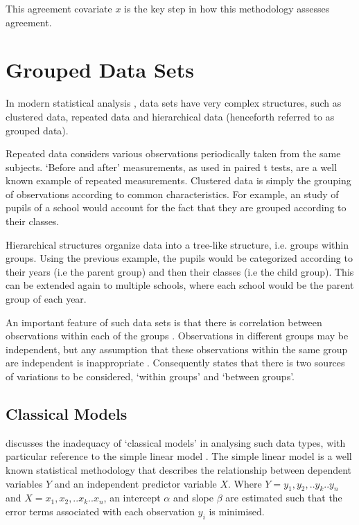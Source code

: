 \documentclass[12pt, a4paper]{report}
\theoremstyle{plain}
\theoremstyle{definition}
\theoremstyle{remark}
\begin{document}
This agreement covariate $x$ is the key step in how this
methodology assesses agreement.

\section{Grouped Data Sets}
In modern statistical analysis , data sets have very complex
structures, such as  clustered data, repeated data and
hierarchical data (henceforth referred to as grouped data).

Repeated data considers various observations periodically taken
from the same subjects. `Before and after' measurements, as used
in paired t tests, are a well known example of repeated
measurements. Clustered data is simply the grouping of
observations according to common characteristics. For example, an
study of pupils of a school would account for the fact that they
are grouped according to their classes.

Hierarchical structures organize data into a tree-like structure,
i.e. groups within groups. Using the previous example, the pupils
would be categorized according to their years (i.e the parent
group) and then their classes (i.e the child group). This can be
extended again to multiple schools, where each school would be the
parent group of each year.

An important feature of such data sets is that there is
correlation between observations within each of the groups
\citep{Faraway}. Observations in different groups may be
independent, but any assumption that these observations within the
same group are independent is inappropriate . Consequently
\citet{Demi} states that there is two sources of variations to be
considered, `within groups' and `between groups'.


\subsection{Classical Models}
\citet{Demi} discusses the inadequacy of `classical models' in
analysing such data types, with particular reference to the simple
linear model . The simple linear model is a well known statistical
methodology that describes the relationship between dependent
variables $Y$ and an independent predictor variable $X$. Where
$Y={y_{1},y_{2},..y_{k}..y_{n}}$ and
$X={x_{1},x_{2},..x_{k}..x_{n}}$, an intercept $\alpha$ and slope
$\beta$ are estimated such that the error terms associated with
each observation $y_{i}$ is minimised.
\end{document}
